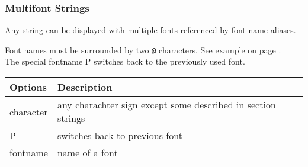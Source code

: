 
\subsubsection{Multifont Strings}
\label{sec:multifont}
Any string can be displayed with multiple fonts referenced by font name aliases.





Font names must be surrounded by two \verb+@+ characters. See example on page \pageref{sec:multifontexamples}. \\
The special fontname P switches back to the previously used font.\\



\begin{tabularx}{\textwidth}{l|X}
Options    & Description \\
\hline
character  & any charachter sign except some described in section strings \nameref{sec:string} \\
P          & switches back to previous font \index{multifont strings!P}\\
fontname   & name of a font \\ %
\end{tabularx}

